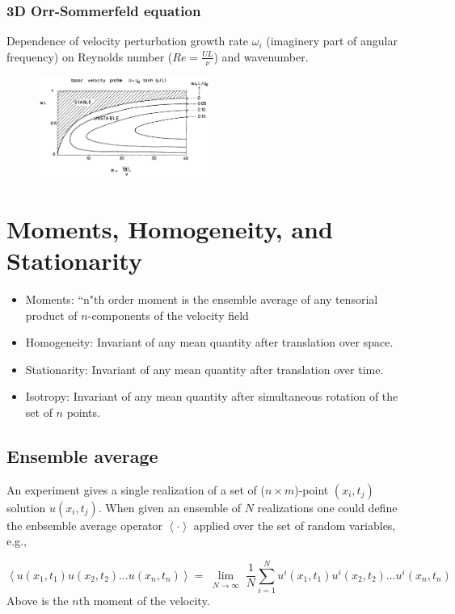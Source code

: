 \subsubsection{3D Orr-Sommerfeld equation}
Dependence of velocity perturbation growth rate $\omega_i$ (imaginery part of angular frequency) on Reynolds number ($Re= \frac{UL}{\nu}$) and wavenumber.
\begin{figure}[H]
   \includegraphics[width=0.5\textwidth]{3d_Instability}
\end{figure} 





\section{Moments, Homogeneity, and Stationarity}
\begin{itemize}
   \item{Moments}: ``n"th order moment is the ensemble average of any tensorial product of $n$-components of the velocity field 
   \item{Homogeneity}: Invariant of any mean quantity after translation over space.
   \item{Stationarity}: Invariant of any mean quantity after translation over time.
   \item{Isotropy}: Invariant of any mean quantity after simultaneous rotation of the set of $n$ points.
\end{itemize}
\subsection{Ensemble average}
An experiment gives a single realization of a set of ($n \times m$)-point $(x_i,t_j)$ solution $u(x_i,t_j)$.
When given an ensemble of $N$ realizations one could define the enbsemble average operator $\left< \cdot \right>$ applied over the set of random variables, e.g.,

\begin{equation}
   \left< u(x_1,t_1) u(x_2,t_2) \dotsc u(x_n,t_n) \right> = \lim_{\substack{N \rightarrow \infty}}\frac{1}{N}\sum\limits^N_{i=1} u^i(x_1,t_1)u^i(x_2,t_2)\dotsc u^i(x_n,t_n)
\end{equation}
Above is the $n$th moment of the velocity.

